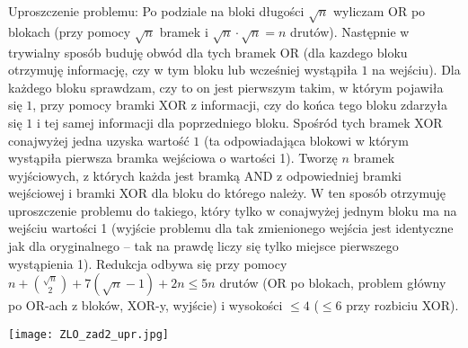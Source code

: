 \documentclass{article}
\begin{document}
Uproszczenie problemu:\newline
Po podziale na bloki długości $\sqrt{n}$ wyliczam OR po blokach (przy pomocy $\sqrt{n}$ bramek i $\sqrt{n}\cdot\sqrt{n}=n$ drutów).
Następnie w trywialny sposób buduję obwód dla tych bramek OR (dla kazdego bloku otrzymuję informację,
czy w tym bloku lub wcześniej wystąpiła $1$ na wejściu).\newline
Dla każdego bloku sprawdzam, czy to on jest pierwszym takim, w którym pojawiła się $1$, przy pomocy bramki XOR z informacji,
czy do końca tego bloku zdarzyła się $1$ i tej samej informacji dla poprzedniego bloku.\newline
Spośród tych bramek XOR conajwyżej jedna uzyska wartość $1$ (ta odpowiadająca blokowi w którym wystąpiła pierwsza bramka wejściowa o wartości 1).\newline
Tworzę $n$ bramek wyjściowych, z których każda jest bramką AND z odpowiedniej bramki wejściowej i bramki XOR dla bloku do którego należy.\newline\newline
W ten sposób otrzymuję uproszczenie problemu do takiego, który tylko w conajwyżej jednym bloku ma na wejściu wartości 1
(wyjście problemu dla tak zmienionego wejścia jest identyczne jak dla oryginalnego -- tak na prawdę liczy się tylko miejsce pierwszego wystąpienia 1).
Redukcja odbywa się przy pomocy $n+{\sqrt{n}\choose2}+7(\sqrt{n}-1)+2n\le5n$ drutów
(OR po blokach, problem główny po OR-ach z bloków, XOR-y, wyjście) i wysokości $\le4$ ($\le6$ przy rozbiciu XOR).\newline\newline
\begin{center}\texttt{[image: ZLO\_zad2\_upr.jpg]}\end{center}\newpage
\end{document}
